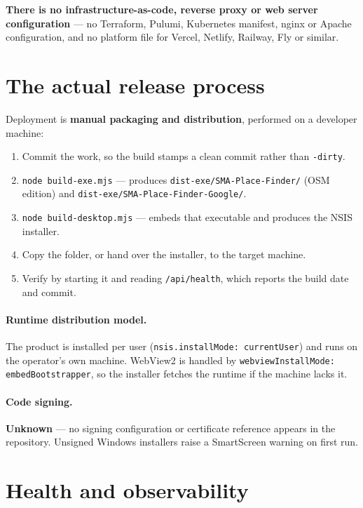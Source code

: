 \documentclass[11pt,a4paper]{report}
\newcommand{\code}[1]{\texttt{\small #1}}
\DeclareRobustCommand{\file}[1]{{\small\nolinkurl{#1}}}
\newcommand{\lblU}{\textcolor{cNote}{\textbf{Unknown}}}
\begin{document}
\textbf{There is no infrastructure-as-code, reverse proxy or web server
configuration} --- no Terraform, Pulumi, Kubernetes manifest, nginx or Apache
configuration, and no platform file for Vercel, Netlify, Railway, Fly or similar.

\section{The actual release process}

Deployment is \textbf{manual packaging and distribution}, performed on a
developer machine:

\begin{enumerate}
\item Commit the work, so the build stamps a clean commit rather than
\code{-dirty}.
\item \code{node build-exe.mjs} --- produces \file{dist-exe/SMA-Place-Finder/}
(OSM edition) and \file{dist-exe/SMA-Place-Finder-Google/}.
\item \code{node build-desktop.mjs} --- embeds that executable and produces the
NSIS installer.
\item Copy the folder, or hand over the installer, to the target machine.
\item Verify by starting it and reading \file{/api/health}, which reports the
build date and commit.
\end{enumerate}

\paragraph{Runtime distribution model.} The product is installed per user
(\code{nsis.installMode: currentUser}) and runs on the operator's own machine.
WebView2 is handled by \code{webviewInstallMode: embedBootstrapper}, so the
installer fetches the runtime if the machine lacks it.

\paragraph{Code signing.} \lblU{} --- no signing configuration or certificate
reference appears in the repository. Unsigned Windows installers raise a
SmartScreen warning on first run.

\section{Health and observability}
\end{document}
